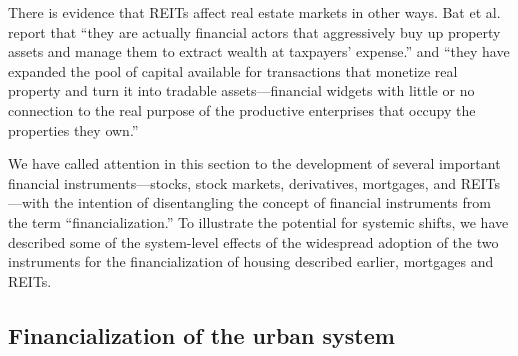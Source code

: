 There is evidence that REITs affect real estate markets in other ways. Bat et al.  \cite{batRolePublicREITs2022} report that  ``they are actually financial actors that aggressively buy up property assets and manage them to extract wealth at taxpayers' expense.'' and ``they have expanded the pool of capital available for transactions that monetize real property and turn it into tradable assets---financial widgets with little or no connection to the real purpose of the productive enterprises that occupy the properties they own.''


We have called attention in this section to the development of several important financial instruments---stocks, stock markets, derivatives, mortgages, and REITs---with the intention of  disentangling the concept of financial instruments from the term ``financialization.'' %
To illustrate the potential for systemic shifts, we have described some of the system-level effects of the widespread adoption of the two instruments for the financialization of housing described earlier, mortgages and REITs. 






\subsection{Financialization of the urban system } 

